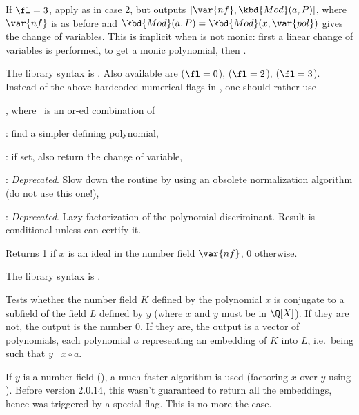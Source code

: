 If $\fl=3$, apply  as in case 2, but outputs
$[\var{nf},\kbd{Mod}(a,P)]$, where $\var{nf}$ is as before and
$\kbd{Mod}(a,P)=\kbd{Mod}(x,\var{pol})$ gives the change of
variables. This is implicit when  is not monic: first a linear change
of variables is performed, to get a monic polynomial, then .

The library syntax is .
Also available are
 ($\fl = 0$),
 ($\fl = 2$),
 ($\fl = 3$).
Instead of the above hardcoded numerical flags in , one should
rather use

, where \fl\ is an
or-ed combination of

\item {}: find a simpler defining polynomial,

\item {}: if  set, also return the change of variable,

\item {}: \emph{Deprecated}. Slow down the routine by using an
obsolete normalization algorithm (do not use this one!),

\item {}: \emph{Deprecated}. Lazy factorization of the
polynomial discriminant. Result is conditional unless 
can certify it.

\label{se:nfisideal}
Returns 1 if $x$ is an ideal in the number field $\var{nf}$, 0 otherwise.

The library syntax is .

\label{se:nfisincl}
Tests whether the number field $K$ defined
by the polynomial $x$ is conjugate to a subfield of the field $L$ defined
by $y$ (where $x$ and $y$ must be in $\Q[X]$). If they are not, the output
is the number 0. If they are, the output is a vector of polynomials, each
polynomial $a$ representing an embedding of $K$ into $L$, i.e.~being such
that $y\mid x\circ a$.

If $y$ is a number field (), a much faster algorithm is used
(factoring $x$ over $y$ using ). Before version 2.0.14, this
wasn't guaranteed to return all the embeddings, hence was triggered by a
special flag. This is no more the case.

